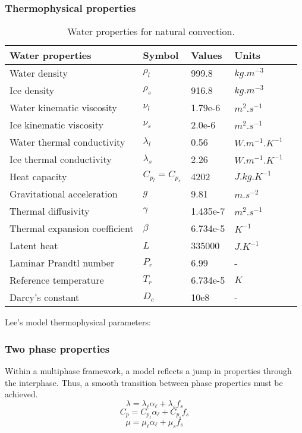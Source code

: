 \subsubsection*{Thermophysical properties}
\begin{table}[h!]
	\begin{tabular}{@{}lllll@{}}
		\toprule[1pt]
		\textbf{Water properties} & \textbf{Symbol} & \textbf{Values} & \textbf{Units} &  \\ \midrule[2pt]
		Water density & $\rho_l$ & 999.8 & $kg.m^{-3}$ \\
		Ice density & $\rho_s$ & 916.8 & $kg.m^{-3}$ \\		
		Water kinematic viscosity & $\nu_{l}$ & 1.79e-6 & $m^{2}.s^{-1}$ \\
		Ice kinematic viscosity & $\nu_{s}$ & 2.0e-6 & $m^{2}.s^{-1}$ \\		
		Water thermal conductivity & $\lambda_{l}$ & 0.56 & $W.m^{-1}.K^{-1}$ \\
		Ice thermal conductivity & $\lambda_{s}$ & 2.26 & $W.m^{-1}.K^{-1}$ \\		
		Heat capacity & $C_{p_{l}}=C_{p_{s}}$ & 4202 & $J.kg.K^{-1}$ \\		 
		Gravitational acceleration & $g$ &  9.81  & $m.s^{-2}$ \\
		Thermal diffusivity & $\gamma$ &  1.435e-7  & $m^{2}.s^{-1}$ \\		
		Thermal expansion coefficient & $\beta$ &  6.734e-5  & $K^{-1}$ \\
		Latent heat & $L$ &  335000  & $J.K^{-1}$ \\			
		Laminar Prandtl number & $P_r$ &  6.99  & - \\
		Reference temperature & $T_r$ &  6.734e-5  & $K$ \\
		Darcy's constant & $D_c$ &  10e8  & - \\		 \bottomrule[1pt]		
	\end{tabular}
	\centering
	\caption{Water properties for natural convection.}	
	\label{fig:waterProperties}
\end{table}

Lee's model thermophysical parameters:

\subsubsection*{Two phase properties}
Within a multiphase framework, a model reflects a jump in properties through the interphase. Thus, a smooth transition between phase properties must be achieved.
\begin{equation}
\lambda=\lambda_{\ell} \alpha_{\ell}+\lambda_{s} f_{s}
\end{equation}
\begin{equation}
C_{p}=C_{p_{\ell}} \alpha_{\ell}+C_{p_{s}} f_{s}
\end{equation}
\begin{equation}
\mu=\mu_{\ell} \alpha_{\ell}+\mu_{s} f_{s}
\end{equation}

